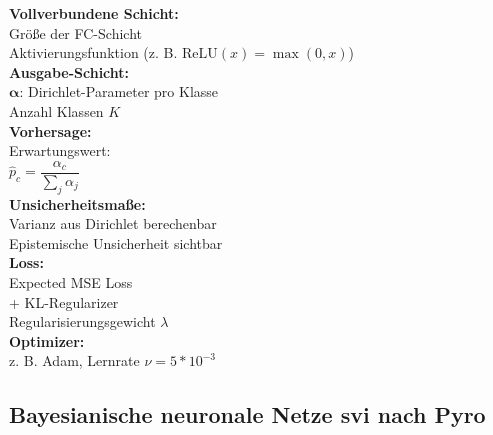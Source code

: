 \begin{center}
\begin{minipage}[t]{0.48\textwidth}
\textbf{Vollverbundene Schicht:} \\
Größe der FC-Schicht \\
Aktivierungsfunktion (z. B. $\text{ReLU}(x) = \max(0, x)$) \\[4pt]

\textbf{Ausgabe-Schicht:} \\
$\boldsymbol{\alpha}$: Dirichlet-Parameter pro Klasse \\
Anzahl Klassen $K$ \\[4pt]

\textbf{Vorhersage:} \\
Erwartungswert: \\
$\hat{p}_c = \dfrac{\alpha_c}{\sum_j \alpha_j}$ \\[4pt]

\textbf{Unsicherheitsmaße:} \\
Varianz aus Dirichlet berechenbar \\
Epistemische Unsicherheit sichtbar \\[4pt]

\textbf{Loss:} \\
Expected MSE Loss \\
+ KL-Regularizer \\
Regularisierungsgewicht $\lambda$ \\[4pt]

\textbf{Optimizer:} \\
z. B. Adam, Lernrate $\nu = 5 * 10^{-3}$
\end{minipage}
\end{center}

\newpage




\subsection*{\gls{Bayesianische neuronale Netze} \gls{svi} nach Pyro \parencite{PyroPplDevelopers.2024}}

\par\vspace{1\baselineskip}\noindent

